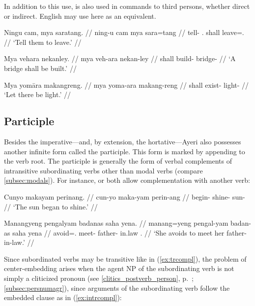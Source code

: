 In addition to this use,  is also used in commands to third 
persons, whether direct or indirect. English may use  here as an 
equivalent.

\pex
\a\begingl
	\gla Ningu cam, mya saratang. //
	\glb ning-u cam mya sara=tang //
	\glc tell-\Imp{} \TplM{}.\Dat{} shall leave=\TplM{}.\Aarg{} //
	\glft `Tell them to leave.' //
\endgl

\a\begingl
	\gla Mya vehara nekanley. //
	\glb mya veh-ara nekan-ley //
	\glc shall build-\TsgI{} bridge-\PargI{} //
	\glft `A bridge shall be built.' //
\endgl

\a\begingl
	\gla Mya yomāra makangreng. //
	\glb mya yoma-ara makang-reng //
	\glc shall exist-\TsgI{} light-\AargI{} //
	\glft `Let there be light.' //
\endgl
\xe


\subsection{Participle}
\label{subsec:participle}
Besides the imperative---and, by extension, the hortative---Ayeri also 
possesses another infinite form called the participle. This form is marked by 
appending  to the verb root. The participle is generally the 
form of verbal complements of intransitive subordinating verbs other than 
modal verbs (compare \autoref{subsec:modals}). For instance,  
 or  both allow 
complementation with another verb:

\pex
\a\label{ex:intrcompl}\begingl
	\gla Cunyo makayam perinang. // 
	\glb cun-yo maka-yam perin-ang // 
	\glc begin-\TsgN{} shine-\Ptcp{} sun-\Aarg{} //
	\glft `The sun began to shine.' //
\endgl

\a\label{ex:trcompl}\begingl
	\gla Manangyeng pengalyam badanas saha yena. //
	\glb manang=yeng pengal-yam badan-as saha yena //
	\glc avoid=\TsgF{}.\Aarg{} meet-\Ptcp{} father-\Parg{} in.law 
		\TsgF{}.\Gen{} //
	\glft `She avoids to meet her father-in-law.' //
\endgl
\xe

Since subordinated verbs may be transitive like in (\ref{ex:trcompl}), the
problem of center-embedding arises when the agent NP of the subordinating verb
is not simply a cliticized pronoun (see \autoref{clitics_postverb_person},
p.~\pageref{clitics_postverb_person}; \ref{subsec:persnumagr}), since
arguments of the subordinating verb follow the embedded clause as in
(\ref{ex:intrcompl}):

